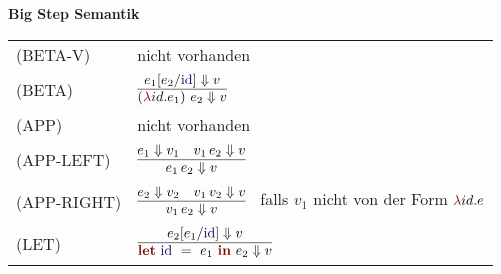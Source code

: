 {
  {\bf Big Step Semantik}\\[5mm]
  \begin{tabular}{ll}
     \mbox{(BETA-V)}      & nicht vorhanden \\[3mm]
     \mbox{(BETA)}        & $\bigsteprule{e_1[e_2/\ExprIdentifier{id}] \eval v}
                              {\ExprApplication{\Parenthesis{\ExprLambda{id}{}{e_1}}}{e_2} \eval v}$ \\[5mm]
     \mbox{(APP)}         & nicht vorhanden \\[3mm]
     \mbox{(APP-LEFT)}    & $\bigsteprule{e_1 \eval v_1 \quad v_1\,e_2 \eval v}
                              {e_1\,e_2 \eval v}$ \\[5mm]
     \mbox{(APP-RIGHT)}   & $\bigsteprule{e_2 \eval v_2 \quad v_1\,v_2 \eval v}
                              {v_1\,e_2 \eval v}$ \ 
                              falls ${v_1}$ nicht von der Form $\ExprLambda{id}{}{e}$ \\[5mm]
     \mbox{(LET)}         & $\bigsteprule{e_2[e_1/\ExprIdentifier{id}] \eval v}
                              {\ExprLet{\ExprIdentifier{id}}{}{e_1}{e_2} \eval v}$ \\[5mm]
  \end{tabular}
}


